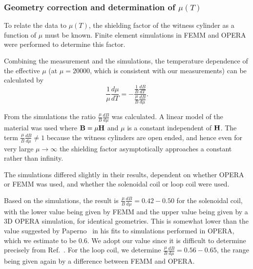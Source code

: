 




\subsubsection{Geometry correction and determination of $\mu(T)$\label{sec:axialsims}}

To relate the data to $\mu(T)$, the shielding factor of the witness
cylinder as a function of $\mu$ must be known.  Finite element
simulations in FEMM and OPERA were performed to determine this factor.

Combining the measurement and the simulations, the temperature
dependence of the effective $\mu$ (at $\mu=20 000$, which is consistent
with our measurements) can be calculated by
\begin{equation}
\frac{1}{\mu}\frac{d\mu}{dT}=-\frac{\frac{1}{B}\frac{dB}{dT}}{\frac{\mu}{B}\frac{dB}{d\mu}}.
\end{equation}

From the simulations the ratio $\frac{\mu}{B} \frac{dB}{d\mu}$ was
calculated.  A linear model of the material was used where
$\bold{B}=\mu \bold{H}$ and $\mu$ is a constant independent of
$\bold{H}$.  The term $\frac{\mu}{B}\frac{dB}{d\mu}\neq 1$ because the
witness cylinders are open ended, and hence even for very large
$\mu\rightarrow\infty$ the shielding factor asymptotically approaches
a constant rather than infinity.

The simulations differed slightly in their results, dependent on
whether OPERA or FEMM was used, and whether the solenoidal coil or
loop coil were used.

Based on the simulations, the result is
$\frac{\mu}{B}\frac{dB}{d\mu}=0.42-0.50$ for the solenoidal coil, with
the lower value being given by FEMM and the upper value being given by
a 3D OPERA simulation, for identical geometries.  This is somewhat
lower than the value suggested by
Paperno~\cite{bib:paperno-open-ended} in his fits to simulations
performed in OPERA, which we estimate to be 0.6.  We adopt our value
since it is difficult to determine precisely from
Ref.~\cite{bib:paperno-open-ended}.  For the loop coil, we determine
$\frac{\mu}{B}\frac{dB}{d\mu}=0.56-0.65$, the range being given again
by a difference between FEMM and OPERA.

